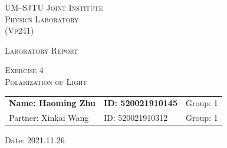 \documentclass{article}
\begin{document}
\vspace*{0.4cm}

\hrulefill %

\thispagestyle{empty} %

\begin{center}
\begin{large}
\scshape{UM--SJTU Joint Institute \vspace{0.3em} \\ Physics Laboratory \\(Vp241)}
\end{large}

\hrulefill %

\vspace*{7.5cm}
\begin{Large}
\scshape{{Laboratory Report}}
\end{Large}

\vspace{2.5em}

\begin{large}
\scshape{Exercise 4}\\
\vspace{0.5em}
\scshape{Polarization of Light}
\end{large}
\end{center}

\vspace{13em}

\begin{table}[h!]
\center
\begin{tabular}{lll}
\textbf{Name: Haoming  Zhu} \hspace*{2em}&
\textbf{ID: 520021910145}\hspace*{2em}
& Group: 1 \\
Partner: Xinkai Wang \hspace*{2em}&
ID: 520021910312\hspace*{2em}
& Group: 1 \\
\end{tabular}
\end{table}

\vspace{-0.4cm}

\begin{center}
\hspace{0.3em} Date: 2021.11.26
\end{center}

\newpage
\tableofcontents
\setcounter{page}{0}
\thispagestyle{empty}
\newpage
\end{document}

